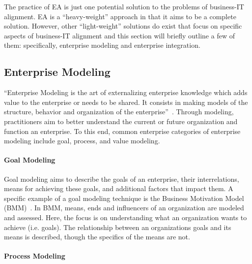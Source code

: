 The practice of EA is just one potential solution to the problems of business-IT alignment. EA is a ``heavy-weight'' approach in that it aims to be a complete solution. However, other ``light-weight'' solutions do exist that focus on specific aspects of business-IT alignment and this section will briefly outline a few of them: specifically, enterprise modeling and enterprise integration. 
  
\subsection{Enterprise Modeling}

``Enterprise Modeling is the art of externalizing enterprise knowledge which adds value to the enterprise or needs to be shared. It consists in making models of the structure, behavior and organization of the enterprise''~\cite{Vernadat200215}. Through modeling, practitioners aim to better understand the current or future organization and function an enterprise. To this end, common enterprise categories of enterprise modeling include goal, process, and value modeling. 

\paragraph*{Goal Modeling}

Goal modeling aims to describe the goals of an enterprise, their interrelations, means for achieving these goals, and additional factors that impact them. A specific example of a goal modeling technique is the Business Motivation Model (BMM)~\cite{bmm2010}. In BMM, means, ends and influencers of an organization are modeled and assessed. Here, the focus is on understanding what an organization wants to achieve (i.e. goals). The relationship between an organizations goals and its means is described, though the specifics of the means are not. 

\paragraph*{Process Modeling}

